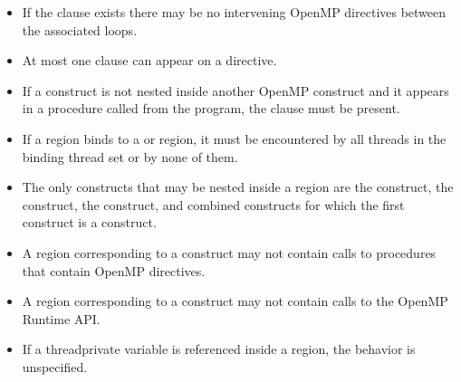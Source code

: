 \begin{itemize}
  \item If the  clause exists there may be no intervening OpenMP
    directives between the associated loops.



  \item At most one  clause can appear on a  directive.

  \item If a  construct is not nested inside another OpenMP
      construct and it appears in a procedure called from the program, the
       clause must be present.

  \item If a  region binds to a  or 
      region, it must be encountered by all threads in the binding thread set
      or by none of them.

  \item The only constructs that may be nested inside a  region
    are the  construct, the  construct, the
     construct, and combined constructs for which the first
    construct is a  construct.


  \item A  region corresponding to a  construct may not
    contain calls to procedures that contain OpenMP directives. 


\item A  region corresponding to a  construct may not
  contain calls to the OpenMP Runtime API.

\item If a threadprivate variable is referenced inside a  region, the behavior is unspecified.

\end{itemize}

